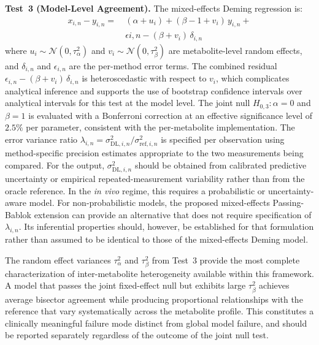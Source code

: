 \textbf{Test~3 (Model-Level Agreement).} The mixed-effects Deming regression is:
\begin{equation}\label{eqn:me_test3}
\begin{aligned}
    x_{i,n} - y_{i,n} =\ &(\alpha + u_i)
        + (\beta - 1 + v_i)\,y_{i,n}
        + \\&\epsilon{i,n} - (\beta + v_i)\,\delta_{i,n}
\end{aligned}
\end{equation}
\noindent where $u_i \sim \mathcal{N}(0,\tau^2_\alpha)$ and $v_i \sim \mathcal{N}(0,\tau^2_\beta)$ are metabolite-level random effects, and $\delta_{i,n}$ and $\epsilon_{i,n}$ are the per-method error terms. The combined residual $\epsilon_{i,n} - (\beta + v_i)\,\delta_{i,n}$ is heteroscedastic with respect to $v_i$, which complicates analytical inference and supports the use of bootstrap confidence intervals over analytical intervals for this test at the model level. The joint null $H_{0,3}: \alpha = 0$ and $\beta = 1$ is evaluated with a Bonferroni correction at an effective significance level of $2.5\%$ per parameter, consistent with the per-metabolite implementation. The error variance ratio $\lambda_{i,n} = \sigma^2_{\mathrm{DL},i,n} / \sigma^2_{\mathrm{ref},i,n}$ is specified per observation using method-specific precision estimates appropriate to the two measurements being compared. For the \DL output, $\sigma_{\mathrm{DL},i,n}^2$ should be obtained from calibrated predictive uncertainty or empirical repeated-measurement variability rather than from the oracle \CRLB reference. In the \textit{in vivo} regime, this requires a probabilistic or uncertainty-aware \DL model. For non-probabilistic \DL models, the proposed mixed-effects Passing-Bablok extension can provide an alternative that does not require specification of $\lambda_{i,n}$. Its inferential properties should, however, be established for that formulation rather than assumed to be identical to those of the mixed-effects Deming model.

The random effect variances $\tau^2_\alpha$ and $\tau^2_\beta$ from Test~3 provide the most complete characterization of inter-metabolite heterogeneity available within this framework. A model that passes the joint fixed-effect null but exhibits large $\tau^2_\beta$ achieves average bisector agreement while producing proportional relationships with the reference that vary systematically across the metabolite profile. This constitutes a clinically meaningful failure mode distinct from global model failure, and should be reported separately regardless of the outcome of the joint null test.

